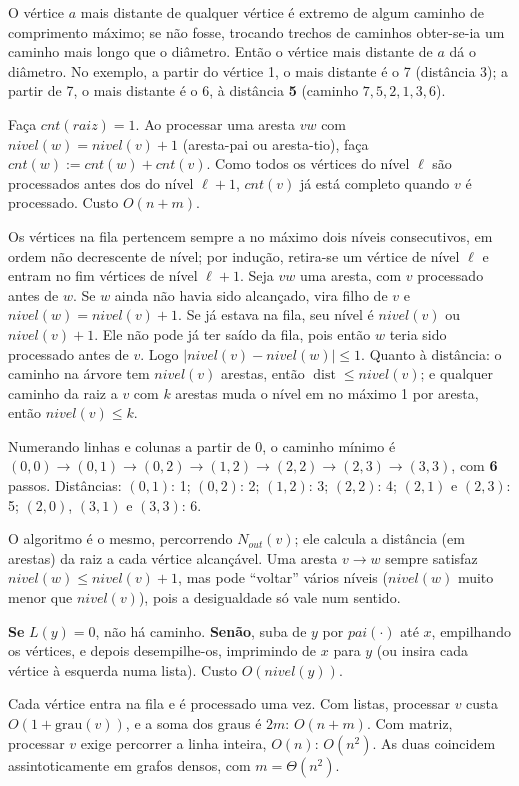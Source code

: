  O vértice $a$ mais distante de qualquer vértice é extremo de algum caminho de comprimento máximo; se não fosse, trocando trechos de caminhos obter-se-ia um caminho mais longo que o diâmetro. Então o vértice mais distante de $a$ dá o diâmetro. No exemplo, a partir do vértice 1, o mais distante é o 7 (distância 3); a partir de 7, o mais distante é o 6, à distância \textbf{5} (caminho $7,5,2,1,3,6$).

 Faça $cnt(raiz)=1$. Ao processar uma aresta $vw$ com $nivel(w)=nivel(v)+1$ (aresta-pai ou aresta-tio), faça $cnt(w):=cnt(w)+cnt(v)$. Como todos os vértices do nível $\ell$ são processados antes dos do nível $\ell+1$, $cnt(v)$ já está completo quando $v$ é processado. Custo $O(n+m)$.

 Os vértices na fila pertencem sempre a no máximo dois níveis consecutivos, em ordem não decrescente de nível; por indução, retira-se um vértice de nível $\ell$ e entram no fim vértices de nível $\ell+1$. Seja $vw$ uma aresta, com $v$ processado antes de $w$. Se $w$ ainda não havia sido alcançado, vira filho de $v$ e $nivel(w)=nivel(v)+1$. Se já estava na fila, seu nível é $nivel(v)$ ou $nivel(v)+1$. Ele não pode já ter saído da fila, pois então $w$ teria sido processado antes de $v$. Logo $|nivel(v)-nivel(w)|\le1$. Quanto à distância: o caminho na árvore tem $nivel(v)$ arestas, então $\operatorname{dist}\le nivel(v)$; e qualquer caminho da raiz a $v$ com $k$ arestas muda o nível em no máximo 1 por aresta, então $nivel(v)\le k$.

 Numerando linhas e colunas a partir de 0, o caminho mínimo é $(0,0)\to(0,1)\to(0,2)\to(1,2)\to(2,2)\to(2,3)\to(3,3)$, com \textbf{6} passos. Distâncias: $(0,1)$: 1; $(0,2)$: 2; $(1,2)$: 3; $(2,2)$: 4; $(2,1)$ e $(2,3)$: 5; $(2,0)$, $(3,1)$ e $(3,3)$: 6.

 O algoritmo é o mesmo, percorrendo $N_{out}(v)$; ele calcula a distância (em arestas) da raiz a cada vértice alcançável. Uma aresta $v\to w$ sempre satisfaz $nivel(w)\le nivel(v)+1$, mas pode ``voltar'' vários níveis ($nivel(w)$ muito menor que $nivel(v)$), pois a desigualdade só vale num sentido.

 \textbf{Se} $L(y)=0$, não há caminho. \textbf{Senão}, suba de $y$ por $pai(\cdot)$ até $x$, empilhando os vértices, e depois desempilhe-os, imprimindo de $x$ para $y$ (ou insira cada vértice à esquerda numa lista). Custo $O(nivel(y))$.

 Cada vértice entra na fila e é processado uma vez. Com listas, processar $v$ custa $O(1+\text{grau}(v))$, e a soma dos graus é $2m$: $O(n+m)$. Com matriz, processar $v$ exige percorrer a linha inteira, $O(n)$: $O(n^2)$. As duas coincidem assintoticamente em grafos densos, com $m=\Theta(n^2)$.


